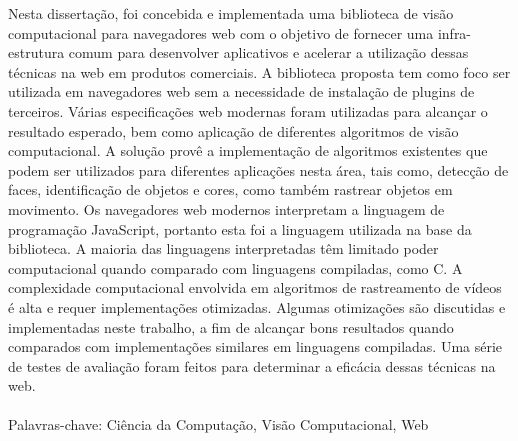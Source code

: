 Nesta dissertação, foi concebida e implementada uma biblioteca de visão computacional para navegadores web com o objetivo de fornecer uma infra-estrutura comum para desenvolver aplicativos e acelerar a utilização dessas técnicas na web em produtos comerciais. A biblioteca proposta tem como foco ser utilizada em navegadores web sem a necessidade de instalação de plugins de terceiros. Várias especificações web modernas foram utilizadas para alcançar o resultado esperado, bem como aplicação de diferentes algoritmos de visão computacional. A solução provê a implementação de algoritmos existentes que podem ser utilizados para diferentes aplicações nesta área, tais como, detecção de faces, identificação de objetos e cores, como também rastrear objetos em movimento. Os navegadores web modernos interpretam a linguagem de programação JavaScript, portanto esta foi a linguagem utilizada na base da biblioteca. A maioria das linguagens interpretadas têm limitado poder computacional quando comparado com linguagens compiladas, como C. A complexidade computacional envolvida em algoritmos de rastreamento de vídeos é alta e requer implementações otimizadas. Algumas otimizações são discutidas e implementadas neste trabalho, a fim de alcançar bons resultados quando comparados com implementações similares em linguagens compiladas. Uma série de testes de avaliação foram feitos para determinar a eficácia dessas técnicas na web.
\\\\
Palavras-chave: Ciência da Computação, Visão Computacional, Web